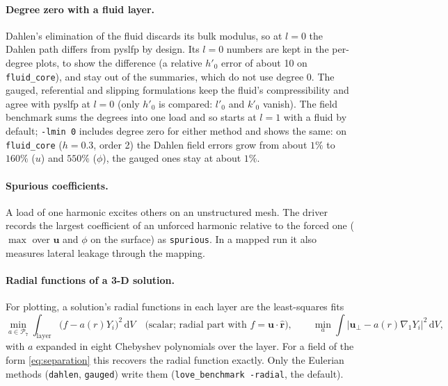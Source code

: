\documentclass[11pt]{article}
\numberwithin{equation}{section}
\newcommand{\dV}{\,\mathrm{d}V}
\newcommand{\vu}{\mathbf{u}}
\newcommand{\rhat}{\hat{\mathbf{r}}}
\newcommand{\code}[1]{\texttt{#1}}
\newcommand{\gradone}{\nabla_{1}}
\begin{document}
\paragraph{Degree zero with a fluid layer.}
Dahlen's elimination of the fluid discards its bulk modulus, so at $l=0$
the Dahlen path differs from pyslfp by design. Its $l=0$ numbers are kept
in the per-degree plots, to show the difference (a relative $h'_0$ error
of about 10 on \code{fluid\_core}), and stay out of the summaries, which
do not use degree 0. The gauged, referential and slipping formulations keep the
fluid's compressibility and agree with pyslfp at $l=0$ (only $h'_0$ is
compared: $l'_0$ and $k'_0$ vanish). The field benchmark sums the degrees
into one load and so starts at $l=1$ with a fluid by default;
\code{-lmin 0} includes degree zero for either method and shows the
same: on \code{fluid\_core} ($h=0.3$, order 2) the Dahlen field errors
grow from about $1\%$ to $160\%$ ($u$) and $550\%$ ($\phi$), the gauged
ones stay at about $1\%$.

\paragraph{Spurious coefficients.}
A load of one harmonic excites others on an unstructured mesh. The
driver records the largest coefficient of an unforced harmonic relative
to the forced one ($\max$ over $\vu$ and $\phi$ on the surface) as
\code{spurious}. In a mapped run it also measures lateral leakage through
the mapping.

\paragraph{Radial functions of a 3-D solution.}
For plotting, a solution's radial functions in each layer are the
least-squares fits
\begin{equation}
  \min_{a\in\mathcal{P}_7}\int_{\text{layer}}\bigl(f - a(r)Y_i\bigr)^2\dV
  \quad\text{(scalar; radial part with } f=\vu\cdot\rhat\text{)},\qquad
  \min_{a}\int\bigl|\vu_\perp - a(r)\gradone Y_i\bigr|^2\dV,
  \label{eq:radialfit}
\end{equation}
with $a$ expanded in eight Chebyshev polynomials over the layer. For a
field of the form \eqref{eq:separation} this recovers the radial function
exactly. Only the Eulerian methods (\code{dahlen}, \code{gauged}) write
them (\code{love\_benchmark -radial}, the default).
\end{document}

